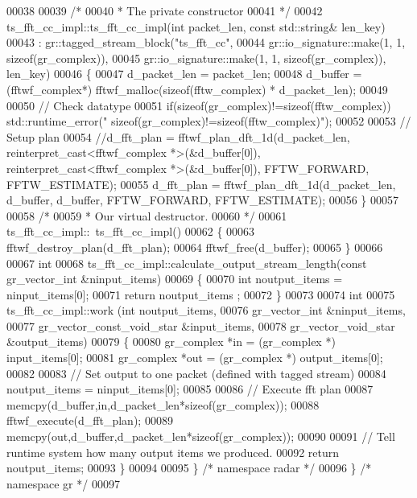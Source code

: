 \begin{DoxyCode}
00038 
00039     \textcolor{comment}{/*}
00040 \textcolor{comment}{     * The private constructor}
00041 \textcolor{comment}{     */}
00042     ts_fft_cc_impl::ts_fft_cc_impl(\textcolor{keywordtype}{int} packet\_len, \textcolor{keyword}{const} std::string& len\_key)
00043       : gr::tagged\_stream\_block(\textcolor{stringliteral}{"ts\_fft\_cc"},
00044               gr::io\_signature::make(1, 1, sizeof(gr\_complex)),
00045               gr::io\_signature::make(1, 1, sizeof(gr\_complex)), len\_key)
00046     \{
00047         d_packet_len = packet\_len;
00048         d_buffer = (fftwf\_complex*) fftwf\_malloc(\textcolor{keyword}{sizeof}(fftw\_complex) * 
      d_packet_len);
00049         
00050         \textcolor{comment}{// Check datatype}
00051         \textcolor{keywordflow}{if}(\textcolor{keyword}{sizeof}(gr\_complex)!=\textcolor{keyword}{sizeof}(fftw\_complex)) std::runtime\_error(\textcolor{stringliteral}{"
      sizeof(gr\_complex)!=sizeof(fftw\_complex)"});
00052         
00053         \textcolor{comment}{// Setup plan}
00054         \textcolor{comment}{//d\_fft\_plan = fftwf\_plan\_dft\_1d(d\_packet\_len, reinterpret\_cast<fftwf\_complex *>(&d\_buffer[0]),
       reinterpret\_cast<fftwf\_complex *>(&d\_buffer[0]), FFTW\_FORWARD, FFTW\_ESTIMATE);}
00055         d_fft_plan = fftwf\_plan\_dft\_1d(d_packet_len, d_buffer, d_buffer, FFTW\_FORWARD, FFTW\_ESTIMATE);
00056     \}
00057 
00058     \textcolor{comment}{/*}
00059 \textcolor{comment}{     * Our virtual destructor.}
00060 \textcolor{comment}{     */}
00061     ts_fft_cc_impl::~ts_fft_cc_impl()
00062     \{
00063         fftwf\_destroy\_plan(d_fft_plan);
00064         fftwf\_free(d_buffer);
00065     \}
00066 
00067     \textcolor{keywordtype}{int}
00068     ts_fft_cc_impl::calculate_output_stream_length(\textcolor{keyword}{const} gr\_vector\_int &ninput\_items)
00069     \{
00070       \textcolor{keywordtype}{int} noutput\_items = ninput\_items[0];
00071       \textcolor{keywordflow}{return} noutput\_items ;
00072     \}
00073 
00074     \textcolor{keywordtype}{int}
00075     ts_fft_cc_impl::work (\textcolor{keywordtype}{int} noutput\_items,
00076                        gr\_vector\_int &ninput\_items,
00077                        gr\_vector\_const\_void\_star &input\_items,
00078                        gr\_vector\_void\_star &output\_items)
00079     \{
00080         gr\_complex *in = (gr\_complex *) input\_items[0];
00081         gr\_complex *out = (gr\_complex *) output\_items[0];
00082         
00083         \textcolor{comment}{// Set output to one packet (defined with tagged stream)}
00084         noutput\_items = ninput\_items[0];
00085             
00086         \textcolor{comment}{// Execute fft plan}
00087         memcpy(d_buffer,in,d_packet_len*\textcolor{keyword}{sizeof}(gr\_complex));
00088         fftwf\_execute(d_fft_plan);
00089         memcpy(out,d_buffer,d_packet_len*\textcolor{keyword}{sizeof}(gr\_complex));
00090 
00091         \textcolor{comment}{// Tell runtime system how many output items we produced.}
00092         \textcolor{keywordflow}{return} noutput\_items;
00093     \}
00094 
00095   \} \textcolor{comment}{/* namespace radar */}
00096 \} \textcolor{comment}{/* namespace gr */}
00097 
\end{DoxyCode}

